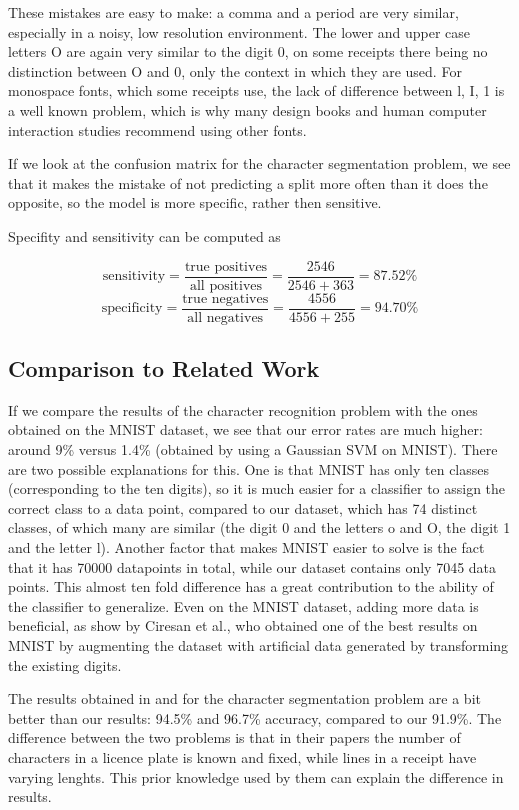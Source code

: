 These mistakes are easy to make: a comma and a period are very similar, especially in a noisy, low resolution environment. The lower and upper case letters O are again very similar to the digit 0, on some receipts there being no distinction between O and 0, only the context in which they are used. For monospace fonts, which some receipts use, the lack of difference between l, I, 1 is a well known problem, which is why many design books and human computer interaction studies recommend using other fonts\cite{chaparro2006examining}. 

If we look at the confusion matrix for the character segmentation problem, we see that it makes the mistake of not predicting a split more often than it does the opposite, so the model is more specific, rather then sensitive. 

Specifity and sensitivity can be computed as\cite{Fawcett_2006}

\[
    \text{sensitivity} = \frac{\text{true positives}}{\text{all positives}} = \frac{2546}{2546+363} = 87.52 \%
\]
\[
    \text{specificity} = \frac{\text{true negatives}}{\text{all negatives}} = \frac{4556}{4556+255} =  94.70 \%
\]

\subsection{Comparison to Related Work}
If we compare the results of the character recognition problem with the ones obtained on the MNIST dataset\cite{lecun1998mnist}, we see that our error rates are much higher: around 9\% versus 1.4\% (obtained by using a Gaussian SVM on MNIST). There are two possible explanations for this. One is that MNIST has only ten classes (corresponding to the ten digits), so it is much easier for a classifier to assign the correct class to a data point, compared to our dataset, which has 74 distinct classes, of which many are similar (the digit 0 and the letters o and O, the digit 1 and the letter l). Another factor that makes MNIST easier to solve is the fact that it has 70000 datapoints in total, while our dataset contains only 7045 data points. This almost ten fold difference has a great contribution to the ability of the classifier to generalize. Even on the MNIST dataset, adding more data is beneficial, as show by Ciresan et al.\cite{Cire_an_2010}, who obtained one of the best results on MNIST by augmenting the dataset with artificial data generated by transforming the existing digits. 

The results obtained in \cite{kahraman2003license} and \cite{Franc_2005} for the character segmentation problem are a bit better than our results: 94.5\% and 96.7\% accuracy, compared to our 91.9\%. The difference between the two problems is that in their papers the number of characters in a licence plate is known and fixed, while lines in a receipt have varying lenghts. This prior knowledge used by them can explain the difference in results. 

